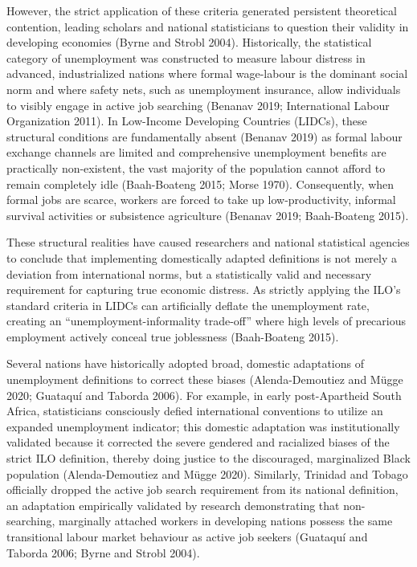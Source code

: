 \documentclass[
  letterpaper,
  DIV=11,
  numbers=noendperiod]{scrartcl}
\begin{document}
However, the strict application of these criteria generated persistent
theoretical contention, leading scholars and national statisticians to
question their validity in developing economies (Byrne and Strobl 2004).
Historically, the statistical category of unemployment was constructed
to measure labour distress in advanced, industrialized nations where
formal wage-labour is the dominant social norm and where safety nets,
such as unemployment insurance, allow individuals to visibly engage in
active job searching (Benanav 2019; International Labour Organization
2011). In Low-Income Developing Countries (LIDCs), these structural
conditions are fundamentally absent (Benanav 2019) as formal labour
exchange channels are limited and comprehensive unemployment benefits
are practically non-existent, the vast majority of the population cannot
afford to remain completely idle (Baah-Boateng 2015; Morse 1970).
Consequently, when formal jobs are scarce, workers are forced to take up
low-productivity, informal survival activities or subsistence
agriculture (Benanav 2019; Baah-Boateng 2015).

These structural realities have caused researchers and national
statistical agencies to conclude that implementing domestically adapted
definitions is not merely a deviation from international norms, but a
statistically valid and necessary requirement for capturing true
economic distress. As strictly applying the ILO's standard criteria in
LIDCs can artificially deflate the unemployment rate, creating an
``unemployment-informality trade-off'' where high levels of precarious
employment actively conceal true joblessness (Baah-Boateng 2015).

Several nations have historically adopted broad, domestic adaptations of
unemployment definitions to correct these biases (Alenda-Demoutiez and
Mügge 2020; Guataquí and Taborda 2006). For example, in early
post-Apartheid South Africa, statisticians consciously defied
international conventions to utilize an expanded unemployment indicator;
this domestic adaptation was institutionally validated because it
corrected the severe gendered and racialized biases of the strict ILO
definition, thereby doing justice to the discouraged, marginalized Black
population (Alenda-Demoutiez and Mügge 2020). Similarly, Trinidad and
Tobago officially dropped the active job search requirement from its
national definition, an adaptation empirically validated by research
demonstrating that non-searching, marginally attached workers in
developing nations possess the same transitional labour market behaviour
as active job seekers (Guataquí and Taborda 2006; Byrne and Strobl
2004).
\end{document}
